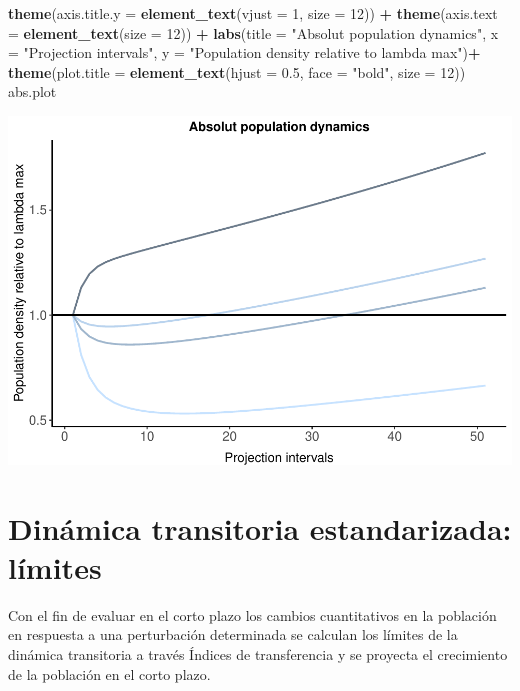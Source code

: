 \documentclass[
]{book}
\newenvironment{Shaded}{\begin{snugshade}}{\end{snugshade}}
\newcommand{\AttributeTok}[1]{\textcolor[rgb]{0.13,0.29,0.53}{#1}}
\newcommand{\DecValTok}[1]{\textcolor[rgb]{0.00,0.00,0.81}{#1}}
\newcommand{\FloatTok}[1]{\textcolor[rgb]{0.00,0.00,0.81}{#1}}
\newcommand{\FunctionTok}[1]{\textcolor[rgb]{0.13,0.29,0.53}{\textbf{#1}}}
\newcommand{\NormalTok}[1]{#1}
\newcommand{\SpecialCharTok}[1]{\textcolor[rgb]{0.81,0.36,0.00}{\textbf{#1}}}
\newcommand{\StringTok}[1]{\textcolor[rgb]{0.31,0.60,0.02}{#1}}
\theoremstyle{definition}
\theoremstyle{definition}
\theoremstyle{definition}
\theoremstyle{definition}
\theoremstyle{remark}
\begin{document}
\begin{Shaded}
\begin{Highlighting}[]
\FunctionTok{theme}\NormalTok{(}\AttributeTok{axis.title.y =} \FunctionTok{element\_text}\NormalTok{(}\AttributeTok{vjust =} \DecValTok{1}\NormalTok{, }\AttributeTok{size =} \DecValTok{12}\NormalTok{)) }\SpecialCharTok{+} 
\FunctionTok{theme}\NormalTok{(}\AttributeTok{axis.text =} \FunctionTok{element\_text}\NormalTok{(}\AttributeTok{size =} \DecValTok{12}\NormalTok{)) }\SpecialCharTok{+}
\FunctionTok{labs}\NormalTok{(}\AttributeTok{title =} \StringTok{"Absolut population dynamics"}\NormalTok{, }\AttributeTok{x =} \StringTok{"Projection intervals"}\NormalTok{, }\AttributeTok{y =} \StringTok{"Population density relative to lambda max"}\NormalTok{)}\SpecialCharTok{+} 
\FunctionTok{theme}\NormalTok{(}\AttributeTok{plot.title =} \FunctionTok{element\_text}\NormalTok{(}\AttributeTok{hjust =} \FloatTok{0.5}\NormalTok{, }\AttributeTok{face =} \StringTok{"bold"}\NormalTok{, }\AttributeTok{size =} \DecValTok{12}\NormalTok{))}
\NormalTok{abs.plot }
\end{Highlighting}
\end{Shaded}

\includegraphics{Diagnostico_Poblacional_files/figure-latex/chap10_4-11.pdf}

\section{Dinámica transitoria estandarizada: límites}\label{dinuxe1mica-transitoria-estandarizada-luxedmites}

Con el fin de evaluar en el corto plazo los cambios cuantitativos en la población en respuesta a una perturbación determinada se calculan los límites de la dinámica transitoria a través Índices de transferencia y se proyecta el crecimiento de la población en el corto plazo.
\end{document}
